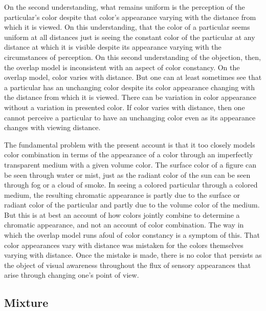 On the second understanding, what remains uniform is the perception of the particular's color despite that color's appearance varying with the distance from which it is viewed. On this understanding, that the color of a particular seems uniform at all distances just is seeing the constant color of the particular at any distance at which it is visible despite its appearance varying with the circumstances of perception. On this second understanding of the objection, then, the overlap model is inconsistent with an aspect of color constancy. On the overlap model, color varies with distance. But one can at least sometimes see that a particular has an unchanging color despite its color appearance changing with the distance from which it is viewed. There can be variation in color appearance without a variation in presented color. If color varies with distance, then one cannot perceive a particular to have an unchanging color even as its appearance changes with viewing distance.

The fundamental problem with the present account is that it too closely models color combination in terms of the appearance of a color through an imperfectly transparent medium with a given volume color. The surface color of a figure can be seen through water or mist, just as the radiant color of the sun can be seen through fog or a cloud of smoke. In seeing a colored particular through a colored medium, the resulting chromatic appearance is partly due to the surface or radiant color of the particular and partly due to the volume color of the medium. But this is at best an account of how colors jointly combine to determine a chromatic appearance, and not an account of color combination. The way in which the overlap model runs afoul of color constancy is a symptom of this. That color appearances vary with distance was mistaken for the colors themselves varying with distance. Once the mistake is made, there is no color that persists as the object of visual awareness throughout the flux of sensory appearances that arise through changing one's point of view.


\subsection{Mixture} %
\label{sub:mixture}

